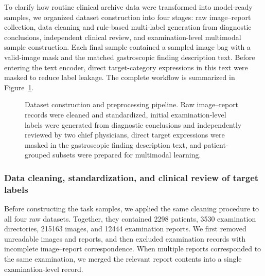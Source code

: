 \documentclass[Afour,sagev,times]{sagej}
\begin{document}
To clarify how routine clinical archive data were transformed into model-ready samples, we organized dataset construction into four stages: raw image--report collection, data cleaning and rule-based multi-label generation from diagnostic conclusions, independent clinical review, and examination-level multimodal sample construction. Each final sample contained a sampled image bag with a valid-image mask and the matched gastroscopic finding description text. Before entering the text encoder, direct target-category expressions in this text were masked to reduce label leakage. The complete workflow is summarized in Figure~\ref{fig:dataset_pipeline}.

\begin{figure}[t]
\centering
\caption{Dataset construction and preprocessing pipeline. Raw image--report records were cleaned and standardized, initial examination-level labels were generated from diagnostic conclusions and independently reviewed by two chief physicians, direct target expressions were masked in the gastroscopic finding description text, and patient-grouped subsets were prepared for multimodal learning.\label{fig:dataset_pipeline}}
\end{figure}

\subsubsection{Data cleaning, standardization, and clinical review of target labels}

Before constructing the task samples, we applied the same cleaning procedure to all four raw datasets. Together, they contained 2298 patients, 3530 examination directories, 215163 images, and 12444 examination reports. We first removed unreadable images and reports, and then excluded examination records with incomplete image--report correspondence. When multiple reports corresponded to the same examination, we merged the relevant report contents into a single examination-level record.
\end{document}
